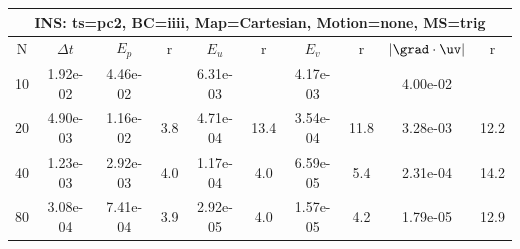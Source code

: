 
\begin{tabular}{|c|c|c|c|c|c|c|c|c|c|} \hline
 \multicolumn{10}{|c|}{INS: ts=pc2, BC=iiii, Map=Cartesian, Motion=none, MS=trig } \\ \hline 
     N  &   $\Delta t$ & $E_p$   &  r  &   $E_u$   &   r    &   $E_v$   & r   &  $|\grad\cdot\uv|$  & r   \\ \hline 
  10   &  1.92e-02  &   4.46e-02  &        &   6.31e-03  &        &   4.17e-03  &        &   4.00e-02  &        \\ 
  20   &  4.90e-03  &   1.16e-02  & 3.8  &   4.71e-04  & 13.4  &   3.54e-04  & 11.8  &   3.28e-03  & 12.2  \\ 
  40   &  1.23e-03  &   2.92e-03  & 4.0  &   1.17e-04  & 4.0  &   6.59e-05  & 5.4  &   2.31e-04  & 14.2  \\ 
  80   &  3.08e-04  &   7.41e-04  & 3.9  &   2.92e-05  & 4.0  &   1.57e-05  & 4.2  &   1.79e-05  & 12.9  \\ 
 \hline 
\end{tabular}
